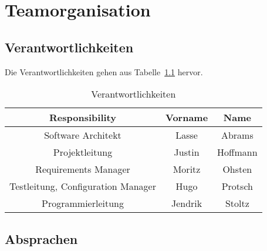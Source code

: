 \chapter{Teamorganisation}\label{ch:teamorganisation}



\section{Verantwortlichkeiten}\label{sec:verantwortlichkeiten}

Die Verantwortlichkeiten gehen aus Tabelle~\ref{tab:verantwortlichkeiten} hervor.

\begin{table}[h]
    \begin{center}
        \begin{tabular}{ |c|c|c| }
            \hline
            Responsibility                     & Vorname & Name     \\
            \hline\hline
            Software Architekt                 & Lasse   & Abrams   \\
            \hline
            Projektleitung                     & Justin  & Hoffmann \\
            \hline
            Requirements Manager               & Moritz  & Ohsten   \\
            \hline
            Testleitung, Configuration Manager & Hugo    & Protsch  \\
            \hline
            Programmierleitung                 & Jendrik & Stoltz   \\
            \hline
        \end{tabular}
    \end{center}
    \caption{Verantwortlichkeiten}
    \label{tab:verantwortlichkeiten}
\end{table}


\section{Absprachen}\label{sec:absprachen}



